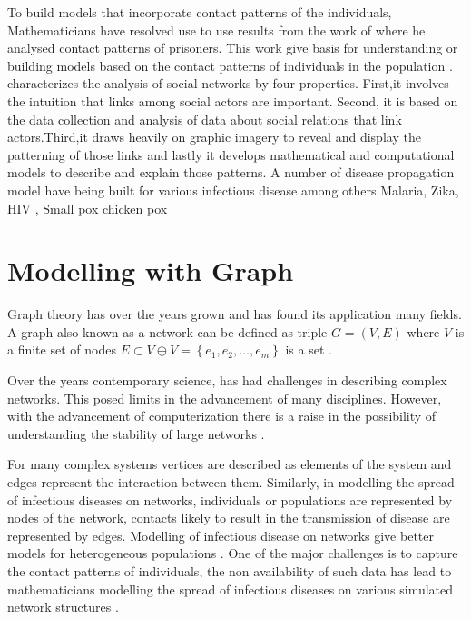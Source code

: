  
 To build models that incorporate contact patterns of the individuals, Mathematicians have resolved use to use results from the work of \cite{moreno1945application} where he analysed contact patterns of prisoners. This work give basis for understanding or building models based on the contact patterns of individuals in the population \citep{sat}. \cite{freeman2004development} characterizes the analysis of social networks by four properties. First,it involves the intuition
 that links among social actors 
are important. Second, it is based on the data collection and analysis of data about social relations that link actors.Third,it draws heavily on graphic imagery to reveal and display the patterning of those links and lastly it develops mathematical and computational models to describe and explain those patterns. 
A number of disease propagation model have being built for various infectious disease among others Malaria, Zika, HIV , Small pox chicken pox \citep{ding2016mathematical}

\section{Modelling with Graph}
Graph theory has over the years grown and has found its application many fields. A graph also known as a network   can be  defined as triple $G = (V,E)$ where $V$ is a finite set of nodes $E \subset V \oplus V = \left\lbrace e_1,e_2,\dots ,e_m \right\rbrace$ is a set  \citep{estrada2012structure}.

Over the years contemporary science, has had challenges in describing complex networks. This posed limits in the advancement of many disciplines. However, with the advancement  of computerization there is a raise in the possibility of understanding the stability of large networks \cite{barabasi1999emergence} .

For many complex systems vertices are described as elements of the system and edges represent the interaction between them. Similarly, in modelling the spread of  infectious diseases on networks, individuals or populations are represented by nodes of the network, contacts likely to result in the transmission of disease are represented by edges. Modelling of infectious disease on networks give better models for heterogeneous populations \citep{ming2016stochastic}. One of the major challenges is to capture the contact patterns of individuals, the non availability of such data has lead to mathematicians modelling the spread of infectious diseases on various simulated network structures \citep{pastor2001}.

